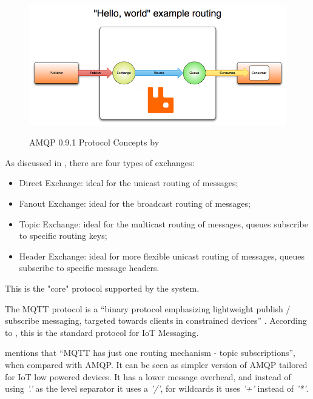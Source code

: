 \begin{figure}[H]
    \centering
    \resizebox{\columnwidth}{!}
    {
       \includegraphics{assets/figures/rabbitmq.png}
    }
    \caption[\gls{AMQP} 0.9.1 Protocol Concepts]{\gls{AMQP} 0.9.1 Protocol Concepts by \cite{rabbitmqexpl}}
    \label{fig:implementation:decisions:rabbitmq}
\end{figure}

As discussed in , there are four types of exchanges:

\begin{itemize}
    \item Direct Exchange: ideal for the unicast routing of messages;
    \item Fanout Exchange: ideal for the broadcast routing of messages;
    \item Topic Exchange: ideal for the multicast routing of messages, queues subscribe to specific routing keys;
    \item Header Exchange: ideal for more flexible unicast routing of messages, queues subscribe to specific message headers.
\end{itemize}

This is the "core" protocol supported by the system.

The \gls{MQTT} protocol is a ``binary protocol emphasizing lightweight publish / subscribe messaging, targeted towards clients in constrained devices'' \parencite{rabbitmq}. According to \cite{mqtt}, this is the standard protocol for \gls{IoT} Messaging.

\cite{mqtt-vs-amqp} mentions that ``\gls{MQTT} has just one routing mechanism - topic subscriptions'', when compared with \gls{AMQP}. It can be seen as simpler version of \gls{AMQP} tailored for \gls{IoT} low powered devices. It has a lower message overhead, and instead of using \textit{'.'} as the level separator it uses a \textit{'/'}, for wildcards it uses \textit{'+'} instead of \textit{'*'}. 

